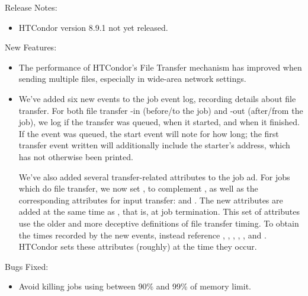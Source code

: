 \noindent Release Notes:

\begin{itemize}

\item HTCondor version 8.9.1 not yet released.

\end{itemize}


\noindent New Features:

\begin{itemize}

\item The performance of HTCondor's File Transfer mechanism has improved when
	sending multiple files, especially in wide-area network settings.

\item We've added six new events to the job event log, recording details
about file transfer.  For both file transfer -in (before/to the job) and
-out (after/from the job), we log if the transfer was queued, when it started,
and when it finished.  If the event was queued, the start event will note
for how long; the first transfer event written will additionally include
the starter's address, which has not otherwise been printed.

We've also added several transfer-related attributes to the job ad.  For jobs
which do file transfer, we now set
, to complement
, as well as the corresponding
attributes for input transfer:
 and
.  The new attributes are added at
the same time as , that is, at
job termination.  This set of attributes use the older and more deceptive
definitions of file transfer timing.  To obtain the times recorded by the
new events, instead reference ,
, ,
, , and
.  HTCondor sets these attributes (roughly) at
the time they occur.


\end{itemize}

\noindent Bugs Fixed:

\begin{itemize}

\item Avoid killing jobs using between 90\% and 99\% of memory limit. 

\end{itemize}

